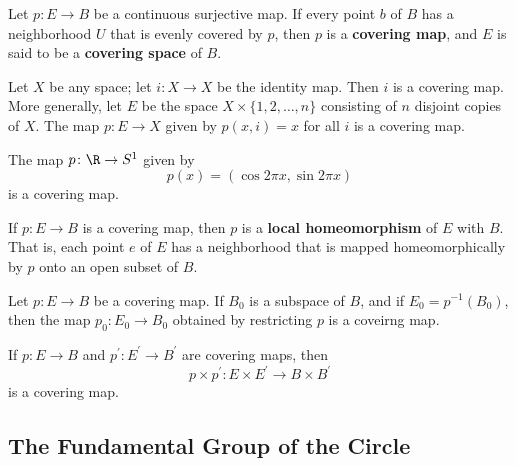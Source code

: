 \begin{definition}
Let $p\colon E \rightarrow B$ be a continuous surjective map. If every point $b$ of $B$ has a neighborhood $U$ that is evenly covered by $p$, then $p$ is a \textbf{covering map},
and $E$ is said to be a \textbf{covering space} of $B$.
\end{definition}

\begin{eg}
Let $X$ be any space; let $i\colon X \rightarrow X$ be the identity map. Then $i$ is a covering map. \\

More generally, let $E$ be the space $X \times \{ 1, 2, \dots, n \}$ consisting of $n$ disjoint copies of $X$. The map $p\colon E \rightarrow X$ given by $p(x, i) = x$ 
for all $i$ is a covering map.
\end{eg}

\begin{theorem}
The map $p\colon \R \rightarrow S^1$ given by 
\[
    p(x) = (\cos 2\pi x, \sin 2\pi x)
\]
is a covering map.
\end{theorem}

\begin{definition}
If $p\colon E \rightarrow B$ is a covering map, then $p$ is a \textbf{local homeomorphism} of $E$ with $B$. \\

That is, each point $e$ of $E$ has a neighborhood that is mapped homeomorphically by $p$ onto an open subset of $B$.
\end{definition}

\begin{theorem}
Let $p\colon E \rightarrow B$ be a covering map. If $B_0$ is a subspace of $B$, and if $E_0 = p^{-1}(B_0)$, then the map $p_0\colon E_0 \rightarrow B_0$ obtained by
restricting $p$ is a coveirng map.
\end{theorem}

\begin{theorem}
If $p\colon E \rightarrow B$ and $p^{\prime}\colon E^{\prime} \rightarrow B^{\prime}$ are covering maps, then
\[
    p \times p^{\prime} \colon E \times E^{\prime} \rightarrow B \times B^{\prime}
\]
is a covering map.
\end{theorem}

\subsection{The Fundamental Group of the Circle}

